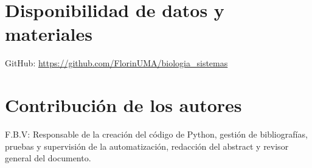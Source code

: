\documentclass{bmcart}
\begin{document}
	\begin{backmatter}
	
		
		\section*{Disponibilidad de datos y materiales}%
			GitHub: \url{https://github.com/FlorinUMA/biologia_sistemas}
		
		\section*{Contribución de los autores}
			F.B.V: Responsable de la creación del código de Python, gestión de bibliografías, pruebas y supervisión de la automatización, redacción del abstract y revisor general del documento.
		
		
		
	
	\end{backmatter}
\end{document}
